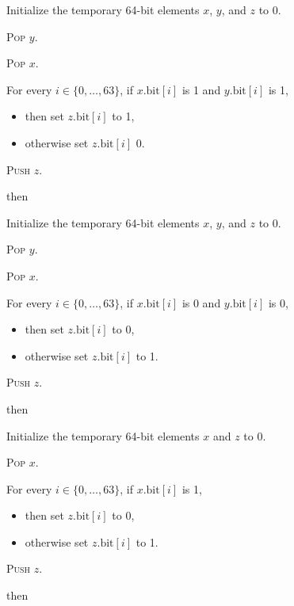 \documentclass[a4paper,12pt]{article}
\newcommand{\num}[1]{\texttt{#1}}
\newcommand{\hex}[1]{\num{#1}_{\textup{\tiny 16}}}
\newcommand{\bitno}[2]{#1.\mathrm{bit}[#2]}
\newcommand{\range}[2]{\{#1,\ldots,#2\}}
\newcommand{\proc}[1]{\textsc{#1}}
\newcommand{\op}[1]{$#1$}
\newcommand{\OR}        [1]{\op{\hex{29}}}
\newcommand{\NOT}       [1]{\op{\hex{2A}}}
\newcommand{\XOR}       [1]{\op{\hex{2B}}}
\begin{document}
\begin{stepnumbers}[start=3]
\begin{description}
\begin{stepnumbers}
    \item Initialize the temporary 64-bit elements $x$, $y$, and $z$ to 0.
    \item \proc{Pop} $y$.
    \item \proc{Pop} $x$.
    \item For every $i \in \range{0}{63}$, if $\bitno{x}{i}$ is 1 and $\bitno{y}{i}$ is 1,
      \begin{itemize}[label=]
      \item then set $\bitno{z}{i}$ to 1,
      \item otherwise set $\bitno{z}{i}$ 0.
      \end{itemize}
    \item \proc{Push} $z$.
    \end{stepnumbers}
  \item[\OR{}] then
    \begin{stepnumbers}
    \item Initialize the temporary 64-bit elements $x$, $y$, and $z$ to 0.
    \item \proc{Pop} $y$.
    \item \proc{Pop} $x$.
    \item For every $i \in \range{0}{63}$, if $\bitno{x}{i}$ is 0 and $\bitno{y}{i}$ is 0,
      \begin{itemize}[label=]
      \item then set $\bitno{z}{i}$ to 0,
      \item otherwise set $\bitno{z}{i}$ to 1.
      \end{itemize}
    \item \proc{Push} $z$.
    \end{stepnumbers}
  \item[\NOT{}] then
    \begin{stepnumbers}
    \item Initialize the temporary 64-bit elements $x$ and $z$ to 0.
    \item \proc{Pop} $x$.
    \item For every $i \in \range{0}{63}$, if $\bitno{x}{i}$ is 1,
      \begin{itemize}[label=]
      \item then set $\bitno{z}{i}$ to 0,
      \item otherwise set $\bitno{z}{i}$ to 1.
      \end{itemize}
    \item \proc{Push} $z$.
    \end{stepnumbers}
  \item[\XOR{}] then

\end{description}
\end{stepnumbers}
\end{document}
